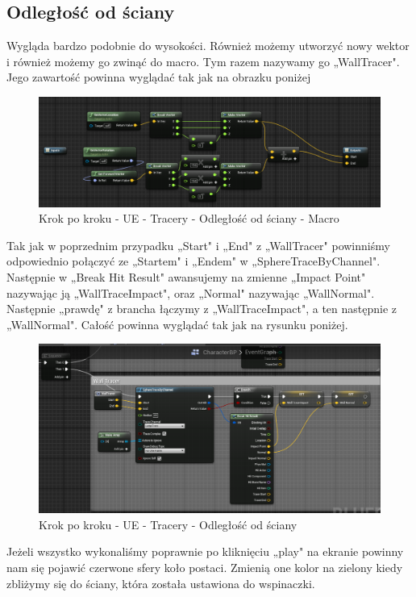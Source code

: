 \documentclass[12pt]{xmgr}
\begin{document}
\subsection{Odległość od ściany}

Wygląda bardzo podobnie do wysokości. Również możemy utworzyć nowy wektor i również możemy go zwinąć do macro. Tym razem nazywamy go „WallTracer". Jego zawartość powinna wyglądać tak jak na obrazku poniżej

\begin{figure}[!htb]
    \begin{center}
    \includegraphics[scale=0.5]{Screeny/UeKrokPoKroku/WallMacro}
    \end{center}
    \caption{Krok po kroku - UE - Tracery - Odległość od ściany - Macro}
\end{figure}

\newpage
Tak jak w poprzednim przypadku „Start" i „End" z „WallTracer" powinniśmy odpowiednio połączyć ze „Startem" i „Endem" w „SphereTraceByChannel". Następnie w „Break Hit Result" awansujemy na zmienne „Impact Point" nazywając ją „WallTraceImpact", oraz „Normal" nazywając „WallNormal". Następnie „prawdę" z brancha łączymy z „WallTraceImpact", a ten następnie z „WallNormal". Całość powinna wyglądać tak jak na rysunku poniżej.

\begin{figure}[!htb]
    \begin{center}
    \includegraphics[scale=0.35]{Screeny/UeKrokPoKroku/UE-WallTracer}
    \end{center}
    \caption{Krok po kroku - UE - Tracery - Odległość od ściany}
\end{figure}
\newpage
Jeżeli wszystko wykonaliśmy poprawnie po kliknięciu „play" na ekranie powinny nam się pojawić czerwone sfery koło postaci. Zmienią one kolor na zielony kiedy zbliżymy się do ściany, która została ustawiona do wspinaczki.
\end{document}
